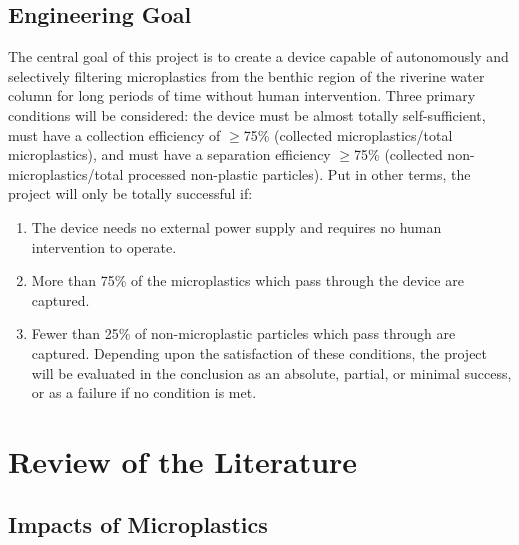 \documentclass[fleqn,10pt]{SelfArx} %
\begin{document}
	\subsection{Engineering Goal}
	The central goal of this project is to create a device capable of autonomously and selectively filtering microplastics from the benthic region of the riverine water column for long periods of time without human intervention. Three primary conditions will be considered: the device must be almost totally self-sufficient, must have a collection efficiency of $\geq$75\% (collected microplastics/total microplastics), and must have a separation efficiency $\geq$75\% (collected non-microplastics/total processed non-plastic particles). Put in other terms, the project will only be totally successful if:
	\begin{enumerate}
		\item The device needs no external power supply and requires no human intervention to operate.
		\item More than 75\% of the microplastics which pass through the device are captured.
		\item Fewer than 25\% of non-microplastic particles which pass through are captured.
		Depending upon the satisfaction of these conditions, the project will be evaluated in the conclusion as an absolute, partial, or minimal success, or as a failure if no condition is met.
		
	\end{enumerate}
	\section{Review of the Literature}
	\subsection{Impacts of Microplastics}
\end{document}
